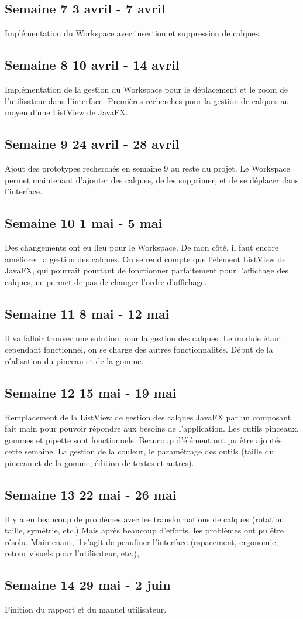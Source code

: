 \subsection{Semaine 7 3 avril - 7 avril}
Implémentation du Workspace avec insertion et suppression de calques.
\subsection{Semaine 8 10 avril - 14 avril}
Implémentation de la gestion du Workspace pour le déplacement et le zoom de l'utilisateur dans l'interface. Premières recherches pour la gestion de calques au moyen d'une ListView de JavaFX.
\subsection{Semaine 9 24 avril - 28 avril}
Ajout des prototypes recherchés en semaine 9 au reste du projet. Le Workspace permet maintenant d'ajouter des calques, de les supprimer, et de se déplacer dans l'interface. 
\subsection{Semaine 10 1 mai - 5 mai}
Des changements ont eu lieu pour le Workspace. De mon côté, il faut encore améliorer la gestion des calques.
On se rend compte que l'élément ListView de JavaFX, qui pourrait pourtant de fonctionner parfaitement pour l'affichage des calques, ne permet de pas de changer l'ordre d'affichage.
\subsection{Semaine 11 8 mai - 12 mai} 
Il va falloir trouver une solution pour la gestion des calques. Le module étant cependant fonctionnel, on se charge des autres fonctionnalités. Début de la réalisation du pinceau et de la gomme.
\subsection{Semaine 12 15 mai - 19 mai}
Remplacement de la ListView de gestion des calques JavaFX par un composant fait main pour pouvoir répondre aux besoins de l'application. Les outils pinceaux, gommes et pipette sont fonctionnels. Beaucoup d'élément ont pu être ajoutés cette semaine. La gestion de la couleur, le paramétrage des outils (taille du pinceau et de la gomme, édition de textes et autres).
\subsection{Semaine 13 22 mai - 26 mai}
Il y a eu beaucoup de problèmes avec les transformations de calques (rotation, taille, symétrie, etc.) Mais après beaucoup d'efforts, les problèmes ont pu être résolu. Maintenant, il s'agit de peaufiner l'interface (espacement, ergonomie, retour visuels pour l'utilisateur, etc.),
\subsection{Semaine 14 29 mai - 2 juin}
Finition du rapport et du manuel utilisateur.



